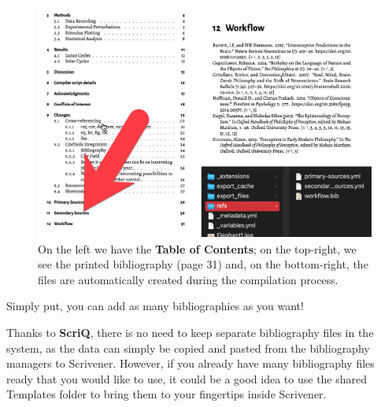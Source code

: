 \documentclass[
  12pt,
  a4paper,
  oneside,
  numbers=noenddot,
  titlepage,
  toclink=all,
  toc=bibliography]{scrbook}
\theoremstyle{definition}
\theoremstyle{definition}
\theoremstyle{definition}
\theoremstyle{plain}
\theoremstyle{plain}
\theoremstyle{plain}
\theoremstyle{plain}
\theoremstyle{plain}
\theoremstyle{remark}
\begin{document}
\begin{figure}

{\centering \includegraphics[width=4.45833in,height=3.07292in]{resultbib.png}

}

\caption{\label{fig-scriv42B}On the left we have the \textbf{Table of
Contents}; on the top-right, we see the printed bibliography (page 31)
and, on the bottom-right, the files are automatically created during the
compilation process.}

\end{figure}

Simply put, you can add as many bibliographies as you want!

\begin{tcolorbox}[enhanced jigsaw, rightrule=.15mm, bottomtitle=1mm, colback=white, toptitle=1mm, left=2mm, colbacktitle=quarto-callout-tip-color!10!white, opacitybacktitle=0.6, opacityback=0, arc=.35mm, leftrule=.75mm, toprule=.15mm, titlerule=0mm, breakable, coltitle=black, bottomrule=.15mm, colframe=quarto-callout-tip-color-frame, title=\textcolor{quarto-callout-tip-color}{\faLightbulb}\hspace{0.5em}{Super tip: Make use of the Templates folder}]

Thanks to \textbf{ScriQ}, there is no need to keep separate bibliography
files in the system, as the data can simply be copied and pasted from
the bibliography managers to Scrivener. However, if you already have
many bibliography files ready that you would like to use, it could be a
good idea to use the shared Templates folder to bring them to your
fingertips inside Scrivener.

\end{tcolorbox}
\end{document}
